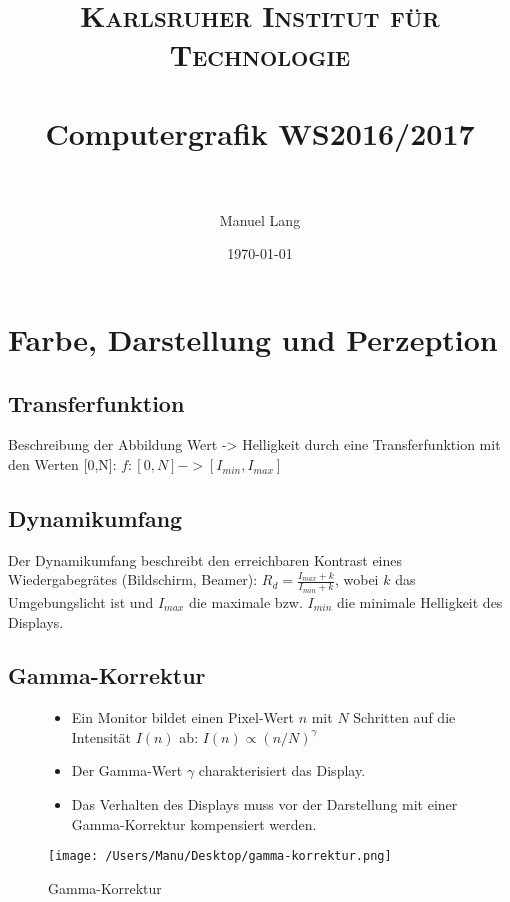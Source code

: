 \documentclass[paper=a4, fontsize=11pt]{scrartcl} %
\title{	
\normalfont \normalsize 
\textsc{Karlsruher Institut für Technologie} \\ [25pt] %
\horrule{0.5pt} \\[0.4cm] %
\huge Computergrafik WS2016/2017\\ %
\horrule{2pt} \\[0.5cm] %
}
\author{Manuel Lang} %
\date{\normalsize\today} %
\numberwithin{equation}{section} %
\numberwithin{figure}{section} %
\numberwithin{table}{section} %
\begin{document}
\maketitle %

{\small\tableofcontents}
\newpage


\section{Farbe, Darstellung und Perzeption}

\subsection{Transferfunktion}

Beschreibung der Abbildung Wert -> Helligkeit durch eine Transferfunktion mit den Werten [0,N]:
$f:[0,N]->[I_{min},I_{max}]$

\subsection{Dynamikumfang}

Der Dynamikumfang beschreibt den erreichbaren Kontrast eines Wiedergabegrätes (Bildschirm, Beamer): $R_d = \frac{I_{max}+k}{I_{min}+k}$, wobei $k$ das Umgebungslicht ist und $I_{max}$ die maximale bzw. $I_{min}$ die minimale Helligkeit des Displays.

\subsection{Gamma-Korrektur}

\begin{figure}[htbp]
\begin{minipage}[t]{6cm}
\vspace{0pt}
\begin{itemize}
\item Ein Monitor bildet einen Pixel-Wert $n$ mit $N$ Schritten auf die Intensität $I(n)$ ab:
$I(n) \propto (n/N)^{\gamma}$
\item Der Gamma-Wert $\gamma$ charakterisiert das Display. 
\item Das Verhalten des Displays muss vor der Darstellung mit einer Gamma-Korrektur kompensiert werden.
\end{itemize}
\end{minipage}
\hfill
\begin{minipage}[t]{6cm}
\vspace{0pt}
\centering
\texttt{[image: /Users/Manu/Desktop/gamma-korrektur.png]}
\caption{Gamma-Korrektur}
\label{fig:Bild1}
\end{minipage}
\end{figure}
\end{document}
